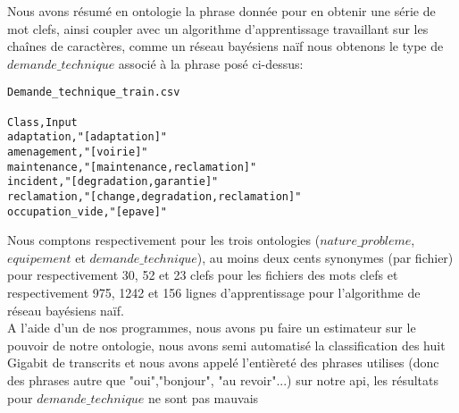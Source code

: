 Nous avons résumé en ontologie la phrase donnée pour en obtenir une série de mot clefs, ainsi coupler avec un algorithme d'apprentissage travaillant sur les chaînes de caractères, comme un réseau bayésiens naïf nous obtenons le type de $demande\_technique$ associé à la phrase posé ci-dessus:

\pagebreak

\begin{lstlisting}
Demande_technique_train.csv

Class,Input
adaptation,"[adaptation]"
amenagement,"[voirie]"
maintenance,"[maintenance,reclamation]"
incident,"[degradation,garantie]"
reclamation,"[change,degradation,reclamation]"
occupation_vide,"[epave]"
\end{lstlisting}

Nous comptons respectivement pour les trois ontologies ($nature\_probleme$, $equipement$ et $demande\_technique$), au moins deux cents synonymes (par fichier) pour respectivement 30, 52 et 23 clefs pour les fichiers des mots clefs et respectivement 975, 1242 et 156 lignes d'apprentissage pour l'algorithme de réseau bayésiens naïf.\\
A l'aide d'un de nos programmes, nous avons pu faire un estimateur sur le pouvoir de notre ontologie, nous avons semi automatisé la classification des huit Gigabit de transcrits et nous avons appelé l'entièreté des phrases utilises (donc des phrases autre que "oui","bonjour", "au revoir"...) sur notre api, les résultats pour $demande\_technique$ ne sont pas mauvais

